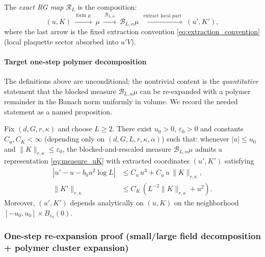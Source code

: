 The \emph{exact RG map} $\mathcal R_L$ is the composition:
\[
(u,K)\ \xrightarrow{\ \text{form } \mu\ }\ \mu
\ \xrightarrow{\ \mathcal B_{L,\alpha}\ }\ \mathcal B_{L,\alpha}\mu
\ \xrightarrow{\ \text{extract local part}\ }\ (u',K'),
\]
where the last arrow is the fixed extraction convention \eqref{eq:extraction_convention} (local plaquette sector absorbed into $u'V$).

\paragraph*{Target one-step polymer decomposition}

The definitions above are unconditional; the nontrivial content is the \emph{quantitative} statement that the blocked measure
$\mathcal B_{L,\alpha}\mu$ can be re-expanded with a polymer remainder in the Banach norm uniformly in volume.
We record the needed statement as a named proposition.

\begin{proposition}\label{prop:h46_one_step_reexpansion}
Fix $(d,G,r,\kappa)$ and choose $L\ge2$.
There exist $u_0>0$, $\varepsilon_0>0$ and constants $C_u,C_K<\infty$ (depending only on $(d,G,L,r,\kappa,\alpha)$) such that:
whenever $|u|\le u_0$ and $\|K\|_{r,\kappa}\le\varepsilon_0$, the blocked-and-rescaled measure $\mathcal B_{L,\alpha}\mu$
admits a representation \eqref{eq:measure_uK} with extracted coordinates $(u',K')$ satisfying
\begin{align}
|u' - u - b_0 u^2\log L| &\le C_u\,u^3 + C_u\,u\,\|K\|_{r,\kappa},\label{eq:h46_u_update}\\
\|K'\|_{r,\kappa} &\le C_K\,(L^{-2}\|K\|_{r,\kappa} + u^2).\label{eq:h46_K_update}
\end{align}
Moreover, $(u',K')$ depends analytically on $(u,K)$ on the neighborhood $[-u_0,u_0]\times B_{\varepsilon_0}(0)$.
\end{proposition}


\subsubsection{One-step re-expansion proof (small/large field decomposition + polymer cluster expansion)}
\label{subsec:hardened47_one_step_proof}


